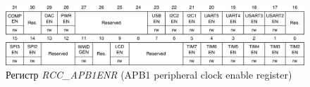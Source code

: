 \begin{figure}[H]
\begin{center}
\includegraphics[scale=0.25]{Image/76.jpg} 
\end{center}
\caption{Регистр \textit{RCC\_APB1ENR} (APB1 peripheral clock enable register)}
\end{figure}